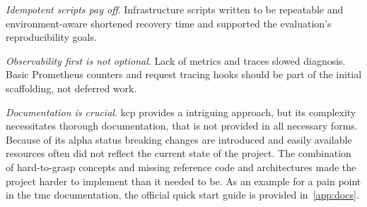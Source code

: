 \documentclass[11pt, a4paper, oneside, listof=totoc]{scrartcl}
\begin{document}
\begin{enumerate}[label={[\arabic*]:},
                ref=Challenge~\arabic*,
                leftmargin=*,
                itemsep=0.6\baselineskip]
                \item\label{chal:evalLessonsIdempotentScripts}
                    \textit{Idempotent scripts pay off}.
                    Infrastructure scripts written to be repeatable and environment-aware shortened
                    recovery time and supported the evaluation's reproducibility goals.
                
                \item\label{chal:evalLessonsObservabilityFirst}
                    \textit{Observability first is not optional}.
                    Lack of metrics and traces slowed diagnosis.
                    Basic Prometheus counters and request tracing hooks should be part of the
                    initial scaffolding, not deferred work.

                \item\label{chal:evalLessonsDocumentation}
                    \textit{Documentation is crucial}.
                    \gls{kcp} provides a intriguing approach, but its complexity necessitates
                    thorough documentation, that is not provided in all necessary forms.
                    Because of its alpha status breaking changes are introduced and easily available
                    resources often did not reflect the current state of the project.
                    The combination of hard-to-grasp concepts and missing reference code and
                    architectures made the project harder to implement than it needed to be.
                    As an example for a pain point in the \gls{tmc} documentation, the official
                    quick start guide is provided in~\autoref{app:docs}.
            \end{enumerate}

        
\end{document}
